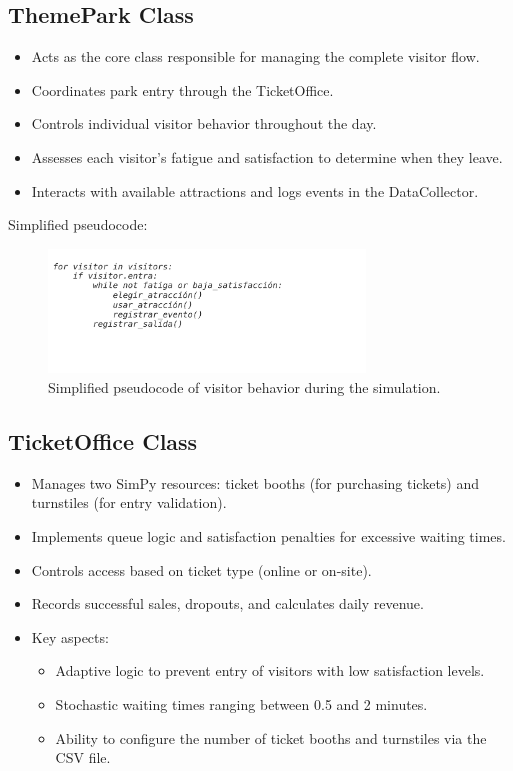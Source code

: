 \documentclass[12pt]{article}
\begin{document}
\subsection{ThemePark Class}

\begin{itemize}
\item  Acts as the core class responsible for managing the complete visitor flow.
\item  Coordinates park entry through the TicketOffice.
\item  Controls individual visitor behavior throughout the day.
\item  Assesses each visitor’s fatigue and satisfaction to determine when they leave.
\item  Interacts with available attractions and logs events in the DataCollector.
\end{itemize}

Simplified pseudocode:


\begin{figure}[H]
    \centering
    \includegraphics[width=0.75\textwidth]{visitor_pseudocode.png}
    \caption{Simplified pseudocode of visitor behavior during the simulation.}
    \label{fig:visitor-pseudocode}
\end{figure}

 \subsection{TicketOffice Class}

\begin{itemize}
\item Manages two SimPy resources: ticket booths (for purchasing tickets) and turnstiles (for entry validation).
\item Implements queue logic and satisfaction penalties for excessive waiting times.
\item Controls access based on ticket type (online or on-site).
\item Records successful sales, dropouts, and calculates daily revenue.
\item Key aspects:
\begin{itemize}
    \item Adaptive logic to prevent entry of visitors with low satisfaction levels.
    \item Stochastic waiting times ranging between 0.5 and 2 minutes.
    \item Ability to configure the number of ticket booths and turnstiles via the CSV file.
\end{itemize}
\end{itemize}
\end{document}
